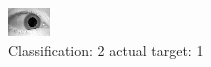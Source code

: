 \begin{figure}[h!]
\begin{center}
\includegraphics[width=0.60\columnwidth]{figures/ID1515_class_2_target_1.png}
\end{center}
\caption{ Classification: 2 actual target: 1}
\label{fig:ID1515_class_2_target_1}
\end{figure}
